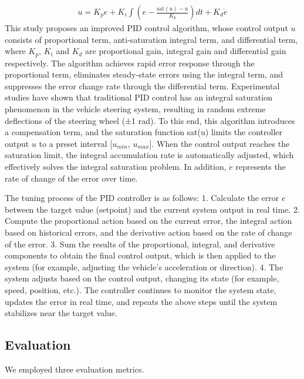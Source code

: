 \documentclass[lettersize,journal]{IEEEtran}
\begin{document}
\begin{align}
	u = K_p e + K_i \int \left( e - \frac{\text{sat}(u)-u}{K_p} \right) dt + K_d \dot{e}
\end{align}
This study proposes an improved PID control algorithm, whose control output \(u\) consists of proportional term, anti-saturation integral term, and differential term, where \(K_p\), \(K_i\) and \(K_d\) are proportional gain, integral gain and differential gain respectively.
The algorithm achieves rapid error response through the proportional term, eliminates steady-state errors using the integral term, and suppresses the error change rate through the differential term.
Experimental studies have shown that traditional PID control has an integral saturation phenomenon in the vehicle steering system, resulting in random extreme deflections of the steering wheel (±1 rad).
To this end, this algorithm introduces a compensation term, and the saturation function sat(u) limits the controller output \(u\) to a preset interval [\(u_{min}\), \(u_{max}\)].
When the control output reaches the saturation limit, the integral accumulation rate is automatically adjusted, which effectively solves the integral saturation problem.
In addition, \(\dot{e}\) represents the rate of change of the error over time.

The tuning process of the PID controller is as follows:  
1. Calculate the error \(e\) between the target value (setpoint) and the current system output in real time.  
2. Compute the proportional action based on the current error, the integral action based on historical errors, and the derivative action based on the rate of change of the error.  
3. Sum the results of the proportional, integral, and derivative components to obtain the final control output, which is then applied to the system (for example, adjusting the vehicle's acceleration or direction). 
4. The system adjusts based on the control output, changing its state (for example, speed, position, etc.). 
The controller continues to monitor the system state, updates the error in real time, and repeats the above steps until the system stabilizes near the target value.


\subsection{Evaluation}

We employed three evaluation metrics.
\end{document}
